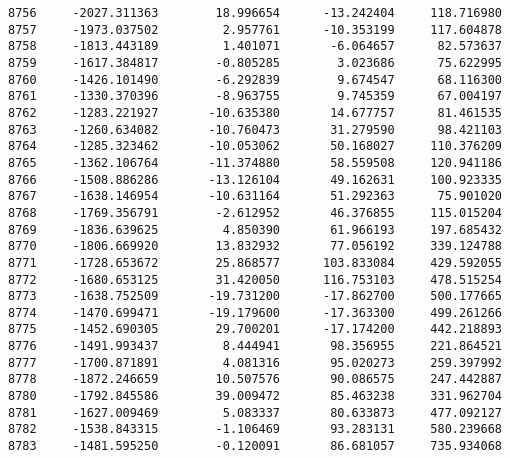 \documentclass[11pt]{article}
\begin{document}
\begin{Verbatim}[commandchars=\\\{\}]
8756     -2027.311363        18.996654      -13.242404     118.716980   
8757     -1973.037502         2.957761      -10.353199     117.604878   
8758     -1813.443189         1.401071       -6.064657      82.573637   
8759     -1617.384817        -0.805285        3.023686      75.622995   
8760     -1426.101490        -6.292839        9.674547      68.116300   
8761     -1330.370396        -8.963755        9.745359      67.004197   
8762     -1283.221927       -10.635380       14.677757      81.461535   
8763     -1260.634082       -10.760473       31.279590      98.421103   
8764     -1285.323462       -10.053062       50.168027     110.376209   
8765     -1362.106764       -11.374880       58.559508     120.941186   
8766     -1508.886286       -13.126104       49.162631     100.923335   
8767     -1638.146954       -10.631164       51.292363      75.901020   
8768     -1769.356791        -2.612952       46.376855     115.015204   
8769     -1836.639625         4.850390       61.966193     197.685432   
8770     -1806.669920        13.832932       77.056192     339.124788   
8771     -1728.653672        25.868577      103.833084     429.592055   
8772     -1680.653125        31.420050      116.753103     478.515254   
8773     -1638.752509       -19.731200      -17.862700     500.177665   
8774     -1470.699471       -19.179600      -17.363300     499.261266   
8775     -1452.690305        29.700201      -17.174200     442.218893   
8776     -1491.993437         8.444941       98.356955     221.864521   
8777     -1700.871891         4.081316       95.020273     259.397992   
8778     -1872.246659        10.507576       90.086575     247.442887   
8780     -1792.845586        39.009472       85.463238     331.962704   
8781     -1627.009469         5.083337       80.633873     477.092127   
8782     -1538.843315        -1.106469       93.283131     580.239668   
8783     -1481.595250        -0.120091       86.681057     735.934068   


\end{Verbatim}
\end{document}
